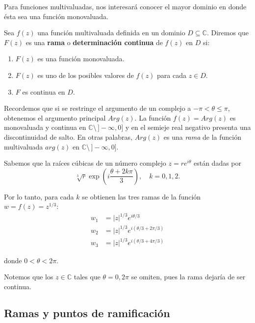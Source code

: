 Para funciones multivaluadas, nos interesará conocer el mayor dominio en donde ésta sea una función monovaluada.

\begin{defi}
Sea $f(z)$ una función multivaluada definida en un dominio $D \subseteq \mathbb{C}$. Diremos que $F(z)$ es una \textbf{rama} o \textbf{determinación continua} de $f(z)$ en $D$ si:
\begin{enumerate}
    \item $F(z)$ es una función monovaluada.
    
    \item $F(z)$ es uno de los posibles valores de $f(z)$ para cada $z \in D$.
    
    \item $F$ es continua en $D$.
\end{enumerate}
\end{defi}

\begin{ejemplo}
Recordemos que si se restringe el argumento de un complejo a $- \pi < \theta \leq \pi$, obtenemos el argumento principal $Arg(z)$. La función $f(z) = Arg(z)$ es monovaluada y continua en $\mathbb{C} \setminus \,]- \infty,0]$ y en el semieje real negativo presenta una discontinuidad de salto. En otras palabras,  $Arg(z)$ es una \textit{rama} de la función multivaluada $arg(z)$ en $\mathbb{C} \setminus \,]- \infty,0]$.
\end{ejemplo}

\begin{ejemplo}
Sabemos que la raíces cúbicas de un número complejo $z = r e^{i \theta}$ están dadas por 
$$\sqrt[3]{r} \exp \left( i \frac{\theta + 2k\pi}{3} \right), \quad k = 0,1,2.$$

Por lo tanto, para cada $k$ se obtienen las tres ramas de la función $w = f(z) = z^{1/3}$:
\begin{align*}
w_1 &= |z|^{1/3} e^{i\theta/3}  \\
w_2 &= |z|^{1/3} e^{i(\theta/3 + 2\pi/3)}  \\
w_3 &= |z|^{1/3} e^{i(\theta/3 + 4\pi/3)}    
\end{align*}

donde $0 < \theta < 2\pi$. 

Notemos que los $z \in \mathbb{C}$ tales que $\theta = 0, 2\pi$ se omiten, pues la rama dejaría de ser continua.
\end{ejemplo}

\subsection{Ramas y puntos de ramificación}

